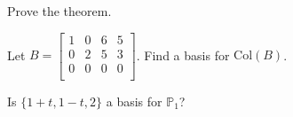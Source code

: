 \documentclass[12pt,letterpaper]{article}
\begin{document}
\begin{enumerate}
\Problem Prove the theorem.

\vfill

\Problem Let $B= \begin{bmatrix} 1 & 0 & 6 & 5\\ 0 & 2 & 5 & 3\\ 0 & 0 &0 & 0\\ \end{bmatrix}$. Find a basis for $\text{Col}(B)$.

\vfill

\Problem Is $\{1+t, 1-t,2\}$ a basis for $\mathbb{P}_1$?

\vfill



%


\end{enumerate}
\end{document}
